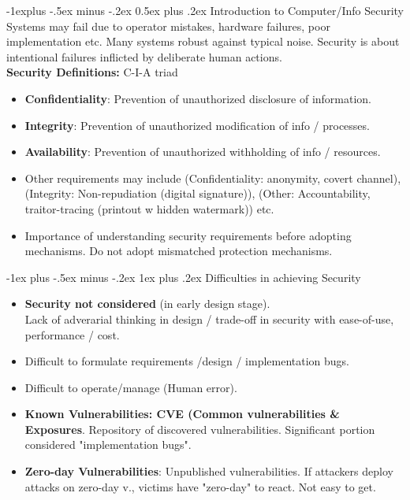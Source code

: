 \documentclass[10pt, landscape]{article}
\makeatletter
\renewcommand{\subsection}{\@startsection{subsection}{2}{0mm}%
                                {-1explus -.5ex minus -.2ex}%
                                {0.5ex plus .2ex}%
                                {\normalfont\normalsize\bfseries}}
\renewcommand{\subsubsection}{\@startsection{subsubsection}{3}{0mm}%
                                {-1ex plus -.5ex minus -.2ex}%
                                {1ex plus .2ex}%
                                {\normalfont\small\bfseries}}
\makeatother
\begin{document}
\begin{multicols*}{3}
\subsection{Introduction to Computer/Info Security}
Systems may fail due to operator mistakes, hardware failures, poor implementation etc. Many systems robust against typical noise. Security is about intentional failures inflicted by deliberate human actions. \\
\textbf{Security Definitions:} C-I-A triad
\begin{itemize}
\item \textbf{Confidentiality}: Prevention of unauthorized disclosure of information.
\item \textbf{Integrity}: Prevention of unauthorized modification of info / processes.
\item \textbf{Availability}: Prevention of unauthorized withholding of info / resources.
\item Other requirements may include (Confidentiality: anonymity, covert channel), (Integrity: Non-repudiation (digital signature)), (Other: Accountability, traitor-tracing (printout w hidden watermark)) etc.
\item Importance of understanding security requirements before adopting mechanisms. Do not adopt mismatched protection mechanisms.
\end{itemize}

\subsubsection{Difficulties in achieving Security}
\begin{itemize}
\item \textbf{Security not considered} (in early design stage). \\
Lack of adverarial thinking in design / trade-off in security with ease-of-use, performance / cost.
\item Difficult to formulate requirements /design / implementation bugs. 
\item Difficult to operate/manage (Human error). \\
\item \textbf{Known Vulnerabilities: CVE (Common vulnerabilities \& Exposures}. Repository of discovered vulnerabilities. Significant portion considered "implementation bugs".
\item \textbf{Zero-day Vulnerabilities}: Unpublished vulnerabilities. If attackers deploy attacks on zero-day v., victims have "zero-day" to react. Not easy to get.
\end{itemize} 



\end{multicols*}
\end{document}
